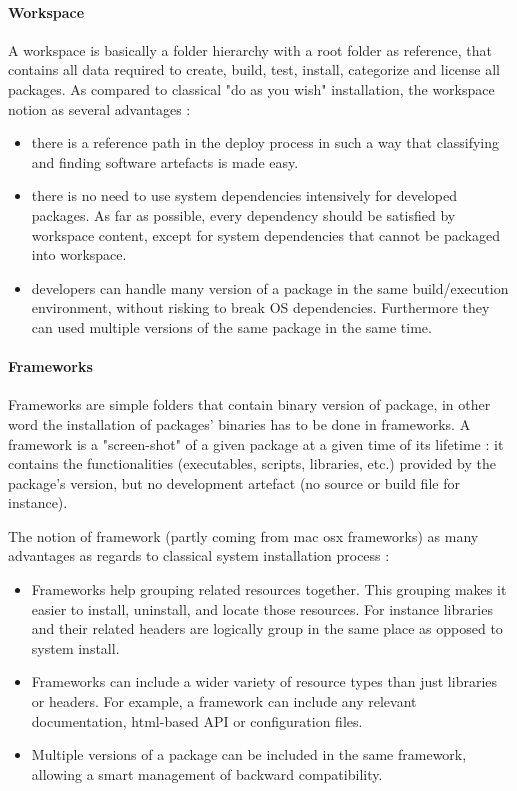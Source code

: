 \documentclass[12pt,a4paper]{article}
\begin{document}
\paragraph*{Workspace}
A workspace is basically a folder hierarchy with a root folder as reference, that contains all data required to create, build, test, install, categorize and license all packages. As compared to classical "do as you wish" installation, the workspace notion as several advantages :
\begin{itemize}
\item there is a reference path in the deploy process in such a way that classifying and finding software artefacts is made easy.
\item there is no need to use system dependencies intensively for developed packages. As far as possible, every dependency should be satisfied by workspace content, except for system dependencies that cannot be packaged into workspace.
\item developers can handle many version of a package in the same build/execution environment, without risking to break OS dependencies. Furthermore they can used multiple versions of the same package in the same time.
\end{itemize}

\paragraph*{Frameworks} 
Frameworks are simple folders that contain binary version of package, in other word the installation of packages' binaries has to be done in frameworks. A framework is a "screen-shot" of a given package at a given time of its lifetime : it contains the functionalities (executables, scripts, libraries, etc.) provided by the package's version, but no development artefact (no source or build file for instance).

The notion of framework (partly coming from mac osx frameworks) as many advantages as regards to classical system installation process :
\begin{itemize}
\item Frameworks help grouping related resources together. This grouping makes it easier to install, uninstall, and locate those resources. For instance libraries and their related headers are logically group in the same place as opposed to system install.
\item Frameworks can include a wider variety of resource types than just libraries or headers. For example, a framework can include any relevant documentation, html-based API or configuration files.
\item Multiple versions of a package can be included in the same framework, allowing a smart management of backward compatibility.
\end{itemize}
\end{document}

